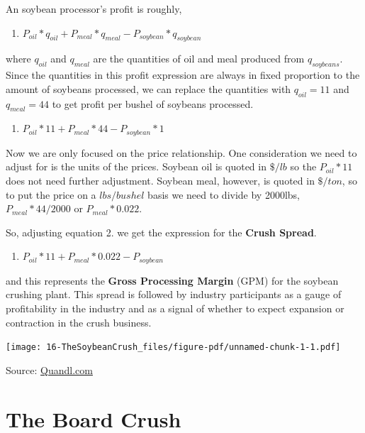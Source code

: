 \documentclass[
  letterpaper,
  DIV=11,
  numbers=noendperiod]{scrreprt}
\providecommand{\tightlist}{%
  \setlength{\itemsep}{0pt}\setlength{\parskip}{0pt}}\usepackage{longtable,booktabs,array}
\begin{document}
An soybean processor's profit is roughly,

\begin{enumerate}
\def\labelenumi{\arabic{enumi}.}
\tightlist
\item
  \(P_{oil}*q_{oil} + P_{meal}*q_{meal} - P_{soybean}*q_{soybean}\)
\end{enumerate}

where \(q_{oil}\) and \(q_{meal}\) are the quantities of oil and meal
produced from \(q_{soybeans}\). Since the quantities in this profit
expression are always in fixed proportion to the amount of soybeans
processed, we can replace the quantities with \(q_{oil} = 11\) and
\(q_{meal} = 44\) to get profit per bushel of soybeans processed.

\begin{enumerate}
\def\labelenumi{\arabic{enumi}.}
\setcounter{enumi}{1}
\tightlist
\item
  \(P_{oil}*11 + P_{meal}*44 - P_{soybean}*1\)
\end{enumerate}

Now we are only focused on the price relationship. One consideration we
need to adjust for is the units of the prices. Soybean oil is quoted in
\(\$/lb\) so the \(P_{oil}*11\) does not need further adjustment.
Soybean meal, however, is quoted in \(\$/ton\), so to put the price on a
\(lbs/bushel\) basis we need to divide by 2000lbs, \(P_{meal}*44/2000\)
or \(P_{meal}*0.022\).

So, adjusting equation 2. we get the expression for the \textbf{Crush
Spread}.

\begin{enumerate}
\def\labelenumi{\arabic{enumi}.}
\setcounter{enumi}{2}
\tightlist
\item
  \(P_{oil}*11 + P_{meal}*0.022 - P_{soybean}\)
\end{enumerate}

and this represents the \textbf{Gross Processing Margin} (GPM) for the
soybean crushing plant. This spread is followed by industry participants
as a gauge of profitability in the industry and as a signal of whether
to expect expansion or contraction in the crush business.

\texttt{[image: 16-TheSoybeanCrush\_files/figure-pdf/unnamed-chunk-1-1.pdf]}

Source: \href{www.Quandl.com}{Quandl.com}

\hypertarget{the-board-crush}{%
\section{The Board Crush}\label{the-board-crush}}
\end{document}
